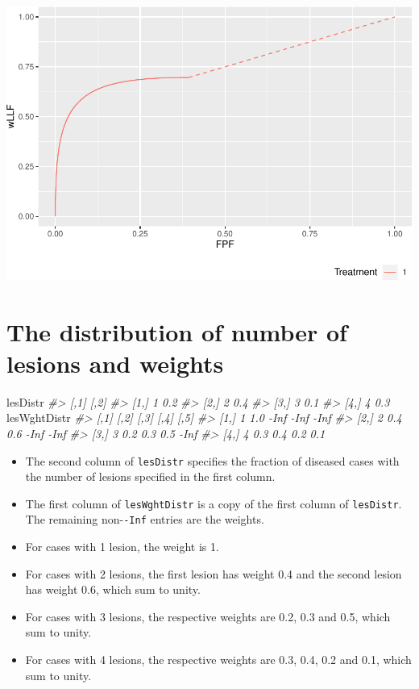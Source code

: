 \documentclass[]{book}
\newenvironment{Shaded}{\begin{snugshade}}{\end{snugshade}}
\newcommand{\CommentTok}[1]{\textcolor[rgb]{0.56,0.35,0.01}{\textit{#1}}}
\newcommand{\NormalTok}[1]{#1}
\providecommand{\tightlist}{%
  \setlength{\itemsep}{0pt}\setlength{\parskip}{0pt}}
\begin{document}
\includegraphics{19-PlotRsmOpCh_files/figure-latex/unnamed-chunk-3-1.pdf}

\hypertarget{the-distribution-of-number-of-lesions-and-weights}{%
\section{The distribution of number of lesions and weights}\label{the-distribution-of-number-of-lesions-and-weights}}

\begin{Shaded}
\begin{Highlighting}[]
\NormalTok{lesDistr}
\CommentTok{#>      [,1] [,2]}
\CommentTok{#> [1,]    1  0.2}
\CommentTok{#> [2,]    2  0.4}
\CommentTok{#> [3,]    3  0.1}
\CommentTok{#> [4,]    4  0.3}
\NormalTok{lesWghtDistr}
\CommentTok{#>      [,1] [,2] [,3] [,4] [,5]}
\CommentTok{#> [1,]    1  1.0 -Inf -Inf -Inf}
\CommentTok{#> [2,]    2  0.4  0.6 -Inf -Inf}
\CommentTok{#> [3,]    3  0.2  0.3  0.5 -Inf}
\CommentTok{#> [4,]    4  0.3  0.4  0.2  0.1}
\end{Highlighting}
\end{Shaded}

\begin{itemize}
\tightlist
\item
  The second column of \texttt{lesDistr} specifies the fraction of diseased cases with the number of lesions specified in the first column.
\item
  The first column of \texttt{lesWghtDistr} is a copy of the first column of \texttt{lesDistr}. The remaining non-\texttt{-Inf} entries are the weights.
\item
  For cases with 1 lesion, the weight is 1.
\item
  For cases with 2 lesions, the first lesion has weight 0.4 and the second lesion has weight 0.6, which sum to unity.
\item
  For cases with 3 lesions, the respective weights are 0.2, 0.3 and 0.5, which sum to unity.
\item
  For cases with 4 lesions, the respective weights are 0.3, 0.4, 0.2 and 0.1, which sum to unity.
\end{itemize}
\end{document}
